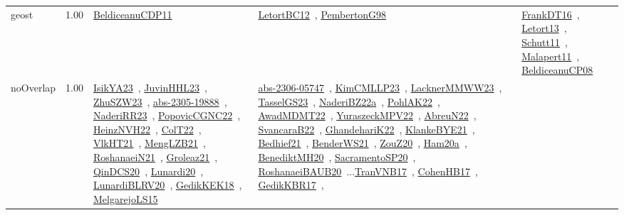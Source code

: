 {\begin{longtable}{p{3cm}r>{\raggedright\arraybackslash}p{6cm}>{\raggedright\arraybackslash}p{6cm}>{\raggedright\arraybackslash}p{8cm}}
\index{geost}\index{Constraints!geost}geost &  1.00 & \href{../works/BeldiceanuCDP11.pdf}{BeldiceanuCDP11}~\cite{BeldiceanuCDP11} & \href{../works/LetortBC12.pdf}{LetortBC12}~\cite{LetortBC12}, \href{../works/PembertonG98.pdf}{PembertonG98}~\cite{PembertonG98} & \href{../works/FrankDT16.pdf}{FrankDT16}~\cite{FrankDT16}, \href{../works/Letort13.pdf}{Letort13}~\cite{Letort13}, \href{../works/Schutt11.pdf}{Schutt11}~\cite{Schutt11}, \href{../works/Malapert11.pdf}{Malapert11}~\cite{Malapert11}, \href{../works/BeldiceanuCP08.pdf}{BeldiceanuCP08}~\cite{BeldiceanuCP08}\\
\index{noOverlap}\index{Constraints!noOverlap}noOverlap &  1.00 & \href{../works/IsikYA23.pdf}{IsikYA23}~\cite{IsikYA23}, \href{../works/JuvinHHL23.pdf}{JuvinHHL23}~\cite{JuvinHHL23}, \href{../works/ZhuSZW23.pdf}{ZhuSZW23}~\cite{ZhuSZW23}, \href{../works/abs-2305-19888.pdf}{abs-2305-19888}~\cite{abs-2305-19888}, \href{../works/NaderiRR23.pdf}{NaderiRR23}~\cite{NaderiRR23}, \href{../works/PopovicCGNC22.pdf}{PopovicCGNC22}~\cite{PopovicCGNC22}, \href{../works/HeinzNVH22.pdf}{HeinzNVH22}~\cite{HeinzNVH22}, \href{../works/ColT22.pdf}{ColT22}~\cite{ColT22}, \href{../works/VlkHT21.pdf}{VlkHT21}~\cite{VlkHT21}, \href{../works/MengLZB21.pdf}{MengLZB21}~\cite{MengLZB21}, \href{../works/RoshanaeiN21.pdf}{RoshanaeiN21}~\cite{RoshanaeiN21}, \href{../works/Groleaz21.pdf}{Groleaz21}~\cite{Groleaz21}, \href{../works/QinDCS20.pdf}{QinDCS20}~\cite{QinDCS20}, \href{../works/Lunardi20.pdf}{Lunardi20}~\cite{Lunardi20}, \href{../works/LunardiBLRV20.pdf}{LunardiBLRV20}~\cite{LunardiBLRV20}, \href{../works/GedikKEK18.pdf}{GedikKEK18}~\cite{GedikKEK18}, \href{../works/MelgarejoLS15.pdf}{MelgarejoLS15}~\cite{MelgarejoLS15} & \href{../works/abs-2306-05747.pdf}{abs-2306-05747}~\cite{abs-2306-05747}, \href{../works/KimCMLLP23.pdf}{KimCMLLP23}~\cite{KimCMLLP23}, \href{../works/LacknerMMWW23.pdf}{LacknerMMWW23}~\cite{LacknerMMWW23}, \href{../works/TasselGS23.pdf}{TasselGS23}~\cite{TasselGS23}, \href{../works/NaderiBZ22a.pdf}{NaderiBZ22a}~\cite{NaderiBZ22a}, \href{../works/PohlAK22.pdf}{PohlAK22}~\cite{PohlAK22}, \href{../works/AwadMDMT22.pdf}{AwadMDMT22}~\cite{AwadMDMT22}, \href{../works/YuraszeckMPV22.pdf}{YuraszeckMPV22}~\cite{YuraszeckMPV22}, \href{../works/AbreuN22.pdf}{AbreuN22}~\cite{AbreuN22}, \href{../works/SvancaraB22.pdf}{SvancaraB22}~\cite{SvancaraB22}, \href{../works/GhandehariK22.pdf}{GhandehariK22}~\cite{GhandehariK22}, \href{../works/KlankeBYE21.pdf}{KlankeBYE21}~\cite{KlankeBYE21}, \href{../works/Bedhief21.pdf}{Bedhief21}~\cite{Bedhief21}, \href{../works/BenderWS21.pdf}{BenderWS21}~\cite{BenderWS21}, \href{../works/ZouZ20.pdf}{ZouZ20}~\cite{ZouZ20}, \href{../works/Ham20a.pdf}{Ham20a}~\cite{Ham20a}, \href{../works/BenediktMH20.pdf}{BenediktMH20}~\cite{BenediktMH20}, \href{../works/SacramentoSP20.pdf}{SacramentoSP20}~\cite{SacramentoSP20}, \href{../works/RoshanaeiBAUB20.pdf}{RoshanaeiBAUB20}~\cite{RoshanaeiBAUB20}...\href{../works/TranVNB17.pdf}{TranVNB17}~\cite{TranVNB17}, \href{../works/CohenHB17.pdf}{CohenHB17}~\cite{CohenHB17}, \href{../works/GedikKBR17.pdf}{GedikKBR17}~\cite{GedikKBR17}, 
\end{longtable}}
